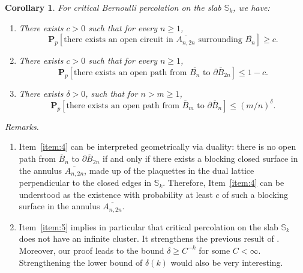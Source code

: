 \documentclass[12pt, twoside,a4paper,reqno]{amsart}
\theoremstyle{plain}
\newtheorem{corollary}[theorem]{Corollary}
\theoremstyle{remark}
\theoremstyle{definition}
\newcommand{\ol}{\overline}
\renewcommand{\bar}{\overline}
\begin{document}
\begin{corollary}
\label{cor}For critical Bernoulli percolation on the slab $\mathbb S_k$, we have:
\begin{enumerate}[\bf 1.]
\item\label{item:3} {} There
  exists $c>0$ such that for every $n\ge1$,
  \[\mathbf P_p [ \text{there exists an open circuit in $\ol{A_{n,2n}}$ surrounding $\ol{B_n}$} ]\ge c .\]

\item\label{item:4} {} There exists
 $c>0$ such that for every $n\ge1$,
  \[\mathbf P_p [ \text{there exists an open path from $\bar{B_n}$  to $\partial
  \bar{B}_{2n}$} ]\le 1-c .\]


\item\label{item:5} {}  There exists $\delta >0$, such
  that for $n>m\geq 1$,
  \begin{equation*}
    \mathbf P_p [ \text{there exists an open path from $\bar{B}_{m}$ to $\partial \bar{B}_{n}$} ] \leq \left( m/n\right) ^{\delta }.
  \end{equation*}
\end{enumerate}
\end{corollary}

\smallskip
\noindent\textit{Remarks.}

  \begin{enumerate}[1.]
  \item Item~\ref{item:4} can be interpreted geometrically via duality: there is
    no open path from $\bar B_n$ to $\partial \bar B_{2n}$ if and only if there
    exists a blocking closed surface in the annulus $\ol{A_{n,2n}}$, made up of
    the plaquettes in the dual lattice perpendicular to the closed edges in
    $\mathbb S_k$. Therefore, Item~\ref{item:4} can be understood as the
    existence with probability at least $c$ of such a blocking surface in the
    annulus $\ol{A_{n,2n}}$.
  \item Item~\ref{item:5} implies in particular that critical percolation on the
    slab $\mathbb S_k$ does not have an infinite cluster. It strengthens the
    previous result of \cite{DST}. Moreover, our proof leads to the bound
    $\delta \ge C^{-k}$ for some $C < \infty$. Strengthening the lower bound of
    $\delta(k)$ would also be very interesting.
  \end{enumerate}
\end{document}
